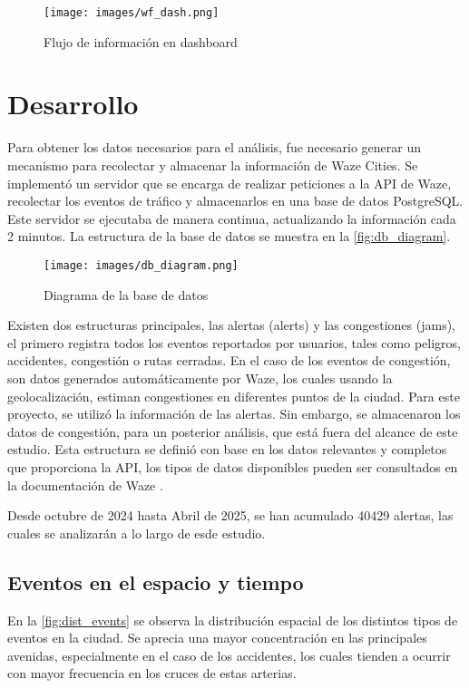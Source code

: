 \documentclass[12pt]{article}
\begin{document}
\begin{figure}[h]
    \centering
    \texttt{[image: images/wf\_dash.png]}
    \caption{Flujo de información en dashboard}
    \label{fig:wf_dash}
\end{figure}

\section{Desarrollo}

Para obtener los datos necesarios para el análisis, fue necesario generar un mecanismo para recolectar y almacenar la información de Waze Cities. Se implementó un servidor que se encarga de realizar peticiones a la API de Waze, recolectar los eventos de tráfico y almacenarlos en una base de datos PostgreSQL. Este servidor se ejecutaba de manera continua, actualizando la información cada 2 minutos. La estructura de la base de datos se muestra en la \autoref{fig:db_diagram}.

\begin{figure}[H]
    \centering
    \texttt{[image: images/db\_diagram.png]}
    \caption{Diagrama de la base de datos}
    \label{fig:db_diagram}
\end{figure}

Existen dos estructuras principales, las alertas (alerts) y las congestiones (jams), el primero registra todos los eventos reportados por usuarios, tales como peligros, accidentes, congestión o rutas cerradas. En el caso de los eventos de congestión, son datos generados automáticamente por Waze, los cuales usando la geolocalización, estiman congestiones en diferentes puntos de la ciudad. Para este proyecto, se utilizó la información de las alertas. Sin embargo, se almacenaron los datos de congestión, para un posterior análisis, que está fuera del alcance de este estudio. Esta estructura se definió con base en los datos relevantes y completos que proporciona la API, los tipos de datos disponibles pueden ser consultados en la documentación de Waze \parencite{waze2024}.

Desde octubre de 2024 hasta Abril de 2025, se han acumulado 40429 alertas, las cuales se analizarán a lo largo de esde estudio.


\subsection{Eventos en el espacio y tiempo}

En la \autoref{fig:dist_events} se observa la distribución espacial de los distintos tipos de eventos en la ciudad. Se aprecia una mayor concentración en las principales avenidas, especialmente en el caso de los accidentes, los cuales tienden a ocurrir con mayor frecuencia en los cruces de estas arterias.
\end{document}
